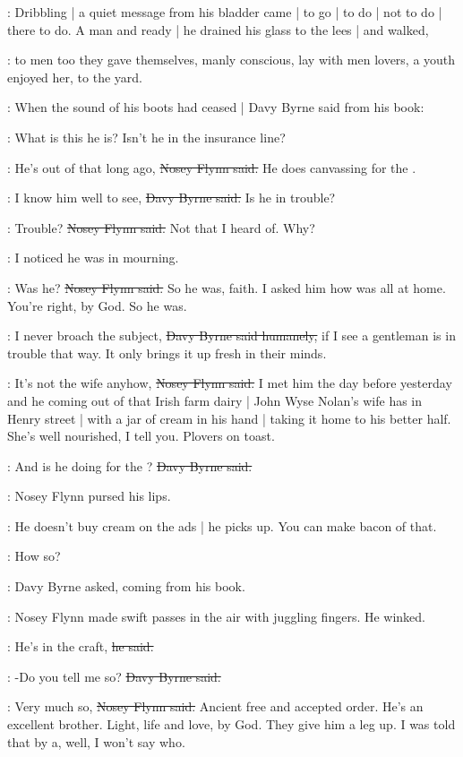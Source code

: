 :
Dribbling |
a quiet message from his bladder came |
to go |
to do |
not to do |
there to do.
A man and ready |
he drained his glass to the lees |
and walked,

:
to men too they gave themselves,
manly conscious,
lay with men lovers,
a youth enjoyed her,
to the yard.

:
When the sound of his boots had ceased |
Davy Byrne said from his book:

\davybyrne:
What is this he is?
Isn't he in the insurance line?

\nosey:
He's out of that long ago,
\sout{Nosey Flynn said.}
He does canvassing for the .

\davybyrne:
I know him well to see,
\sout{Davy Byrne said.}
Is he in trouble?

\nosey:
Trouble?
\sout{Nosey Flynn said.}
Not that I heard of.
Why?

\davybyrne:
I noticed he was in mourning.

\nosey:
Was he?
\sout{Nosey Flynn said.}
So he was, faith.
I asked him how was all at home.
You're right, by God.
So he was.

\davybyrne:
I never broach the subject,
\sout{Davy Byrne said humanely,}
if I see a gentleman is in trouble that way.
It only brings it up fresh in their minds.

\nosey:
It's not the wife anyhow,
\sout{Nosey Flynn said.}
I met him the day before yesterday
and he coming out of that Irish farm dairy |
John Wyse Nolan's wife has in Henry street |
with a jar of cream in his hand |
taking it home to his better half.
She's well nourished, I tell you.
Plovers on toast.

\davybyrne:
And is he doing for the ?
\sout{Davy Byrne said.}

:
Nosey Flynn pursed his lips.

\nosey:
He doesn't buy cream on the ads |
he picks up.
You can make bacon of that.

\davybyrne:
How so?

:
Davy Byrne asked,
coming from his book.

:
Nosey Flynn made swift passes in the air with juggling fingers.
He winked.

\nosey:
He's in the craft,
\sout{he said.}

\davybyrne:
-Do you tell me so?
\sout{Davy Byrne said.}

\nosey:
Very much so,
\sout{Nosey Flynn said.}
Ancient free and accepted order.
He's an excellent brother.
Light, life and love, by God.
They give him a leg up.
I was told that by a,
well,
I won't say who.

